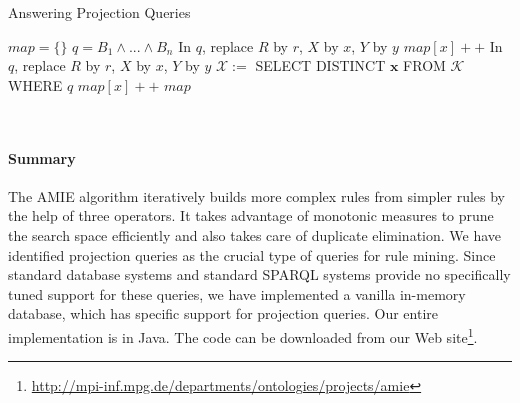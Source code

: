\begin{algorithm}
\caption{Answering Projection Queries}
\label{algi}
\begin{algorithmic}[1]
    \State $map = \{\}$
    \State $q=B_1 \wedge ... \wedge B_n$
	    \State In $q$, replace $R$ by $r$, $X$ by $x$, $Y$ by $y$
		\State $map[x]++$
	    \EndIf
	  \EndFor
	\Else
	    \State In $q$, replace $R$ by $r$, $X$ by $x$, $Y$ by $y$
	    \State $\mathcal{X} :=$ SELECT DISTINCT $\bm{x}$ FROM $\mathcal{K}$ WHERE $q$
		  \State $map[x]++$
	    \EndFor
	  \EndFor
	\EndIf
	\State \Return $map$
\EndFunction
\end{algorithmic}
\end{algorithm}
\ \\[-1cm]


\paragraph{Summary}
The AMIE algorithm iteratively builds more complex rules from simpler rules by the help of three operators.
It takes advantage of monotonic measures to prune the search space efficiently and also takes care of duplicate elimination.
We have identified projection queries as the crucial type of queries for rule mining.
Since standard database systems and standard SPARQL systems provide no specifically tuned support for these queries,
we have implemented a vanilla in-memory database, which has specific support for projection queries.
Our entire implementation is in Java. The code can be downloaded from our Web site\footnote{\url{http://mpi-inf.mpg.de/departments/ontologies/projects/amie}}.

